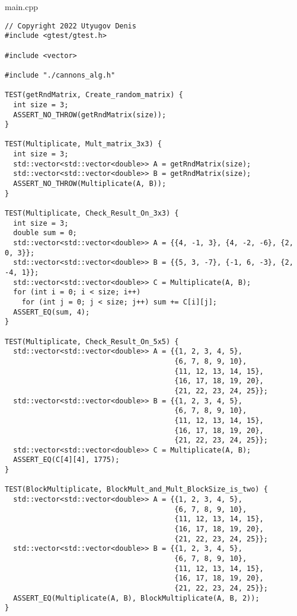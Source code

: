 \documentclass{report}
\begin{document}
main.cpp
\begin{lstlisting} 
// Copyright 2022 Utyugov Denis
#include <gtest/gtest.h>

#include <vector>

#include "./cannons_alg.h"

TEST(getRndMatrix, Create_random_matrix) {
  int size = 3;
  ASSERT_NO_THROW(getRndMatrix(size));
}

TEST(Multiplicate, Mult_matrix_3x3) {
  int size = 3;
  std::vector<std::vector<double>> A = getRndMatrix(size);
  std::vector<std::vector<double>> B = getRndMatrix(size);
  ASSERT_NO_THROW(Multiplicate(A, B));
}

TEST(Multiplicate, Check_Result_On_3x3) {
  int size = 3;
  double sum = 0;
  std::vector<std::vector<double>> A = {{4, -1, 3}, {4, -2, -6}, {2, 0, 3}};
  std::vector<std::vector<double>> B = {{5, 3, -7}, {-1, 6, -3}, {2, -4, 1}};
  std::vector<std::vector<double>> C = Multiplicate(A, B);
  for (int i = 0; i < size; i++)
    for (int j = 0; j < size; j++) sum += C[i][j];
  ASSERT_EQ(sum, 4);
}

TEST(Multiplicate, Check_Result_On_5x5) {
  std::vector<std::vector<double>> A = {{1, 2, 3, 4, 5},
                                        {6, 7, 8, 9, 10},
                                        {11, 12, 13, 14, 15},
                                        {16, 17, 18, 19, 20},
                                        {21, 22, 23, 24, 25}};
  std::vector<std::vector<double>> B = {{1, 2, 3, 4, 5},
                                        {6, 7, 8, 9, 10},
                                        {11, 12, 13, 14, 15},
                                        {16, 17, 18, 19, 20},
                                        {21, 22, 23, 24, 25}};
  std::vector<std::vector<double>> C = Multiplicate(A, B);
  ASSERT_EQ(C[4][4], 1775);
}

TEST(BlockMultiplicate, BlockMult_and_Mult_BlockSize_is_two) {
  std::vector<std::vector<double>> A = {{1, 2, 3, 4, 5},
                                        {6, 7, 8, 9, 10},
                                        {11, 12, 13, 14, 15},
                                        {16, 17, 18, 19, 20},
                                        {21, 22, 23, 24, 25}};
  std::vector<std::vector<double>> B = {{1, 2, 3, 4, 5},
                                        {6, 7, 8, 9, 10},
                                        {11, 12, 13, 14, 15},
                                        {16, 17, 18, 19, 20},
                                        {21, 22, 23, 24, 25}};
  ASSERT_EQ(Multiplicate(A, B), BlockMultiplicate(A, B, 2));
}


\end{lstlisting}
\end{document}
